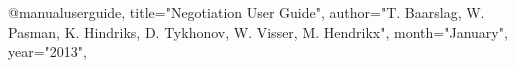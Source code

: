@manual{userguide,
title="Negotiation User Guide",
author="T. Baarslag, W. Pasman, K. Hindriks, D. Tykhonov, W. Visser, M. Hendrikx",
month="January",
year="2013",
}